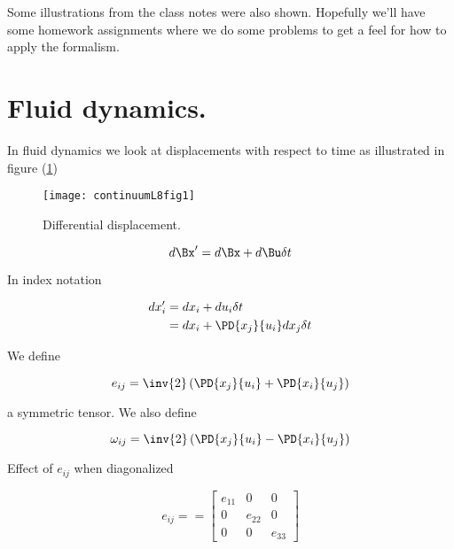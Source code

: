 Some illustrations from the class notes were also shown.  Hopefully we'll have some homework assignments where we do some problems to get a feel for how to apply the formalism.

\section{Fluid dynamics.}


In fluid dynamics we look at displacements with respect to time as illustrated in figure (\ref{fig:continuumL8:continuumL8fig1})
\begin{figure}[htp]
   \centering
   \texttt{[image: continuumL8fig1]}
   \caption{Differential displacement.}\label{fig:continuumL8:continuumL8fig1}
\end{figure}

\begin{equation}\label{eqn:continuumL8:230}
d\Bx' = d\Bx + d\Bu \delta t
\end{equation}

In index notation

\begin{align*}
dx_i'
&= dx_i + du_i \delta t \\
&= dx_i + \PD{x_j}{u_i} dx_j \delta t
\end{align*}

We define

\begin{equation}\label{eqn:continuumL8:250}
e_{ij} = \inv{2} \left(
\PD{x_j}{u_i} +
\PD{x_i}{u_j} \right)
\end{equation}

a symmetric tensor.  We also define

\begin{equation}\label{eqn:continuumL8:270}
\omega_{ij} = \inv{2} \left(
\PD{x_j}{u_i}
-\PD{x_i}{u_j} \right)
\end{equation}

Effect of $e_{ij}$ when diagonalized

\begin{equation}\label{eqn:continuumL8:290}
e_{ij} =
=
\begin{bmatrix}
e_{11} & 0 & 0 \\
0 & e_{22} & 0 \\
0 & 0 & e_{33}
\end{bmatrix}
\end{equation}

